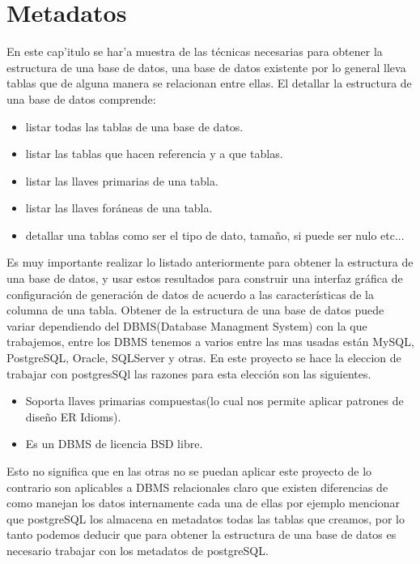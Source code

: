\chapter{Metadatos}

En este cap'itulo se har'a muestra de las t\'ecnicas necesarias para obtener la estructura de una base de datos, una base de datos existente por lo general lleva tablas que de alguna manera se relacionan entre ellas. El detallar la estructura de una base de datos comprende:
\begin{itemize}
\item listar todas las tablas de una base de datos.
\item listar las tablas que hacen referencia y a que tablas.
\item listar las llaves primarias de una tabla.
\item listar las llaves for\'aneas de una tabla.
\item detallar una tablas como ser el tipo de dato, tama\~no, si puede ser nulo etc... 
\end{itemize} 
Es muy importante realizar lo listado anteriormente para obtener la estructura de una base de datos, y usar estos resultados para construir una interfaz gr\'afica de configuraci\'on de generaci\'on de datos de acuerdo a las caracter\'isticas de la columna de una tabla.
Obtener de la estructura de una base de datos puede variar dependiendo del DBMS(Database Managment System) con la que trabajemos, entre los DBMS tenemos a varios entre las mas usadas est\'an MySQL, PostgreSQL, Oracle, SQLServer y otras. En este proyecto se hace la eleccion de  trabajar con postgresSQl las razones para esta elecci\'on son las siguientes.
\begin{itemize}
\item Soporta llaves primarias compuestas(lo cual nos permite aplicar patrones de dise\~no ER Idioms).
\item Es un DBMS de licencia BSD libre.
\end{itemize}
Esto no significa que en las otras no se puedan aplicar este proyecto de lo contrario son aplicables a DBMS relacionales claro que existen diferencias de como manejan los datos internamente cada una de ellas por ejemplo mencionar que postgreSQL los almacena en metadatos todas las tablas que creamos, por lo tanto podemos deducir que para obtener la estructura de una base de datos es necesario trabajar con los metadatos de postgreSQL.
